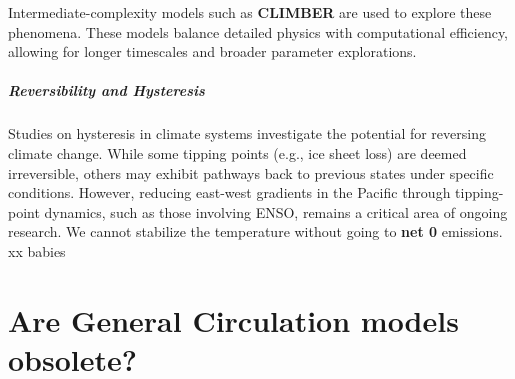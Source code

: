 Intermediate-complexity models such as \textbf{CLIMBER} are used to explore these phenomena. These models balance detailed physics with computational efficiency, allowing for longer timescales and broader parameter explorations.

\paragraph{Reversibility and Hysteresis}

Studies on hysteresis in climate systems investigate the potential for reversing climate change. While some tipping points (e.g., ice sheet loss) are deemed irreversible, others may exhibit pathways back to previous states under specific conditions. However, reducing east-west gradients in the Pacific through tipping-point dynamics, such as those involving ENSO, remains a critical area of ongoing research.
We cannot stabilize the temperature without going to \textbf{net 0} emissions.\\



xx babies

\chapter{Are General Circulation models obsolete?}
